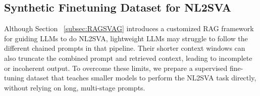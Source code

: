 



\subsection{Synthetic Finetuning Dataset for NL2SVA}
\label{subsec:synthetic-finetuning-dataset}
Although Section ~\ref{subsec:RAGSVAG} introduces a customized RAG framework for guiding LLMs to do NL2SVA, lightweight LLMs may struggle to follow the different chained prompts in that pipeline. 
Their shorter context windows can also truncate the combined prompt and retrieved context, leading to incomplete or incoherent output. 
To overcome these limits, we prepare a supervised fine-tuning dataset that teaches smaller models to perform the NL2SVA task directly, without relying on long, multi-stage prompts.


